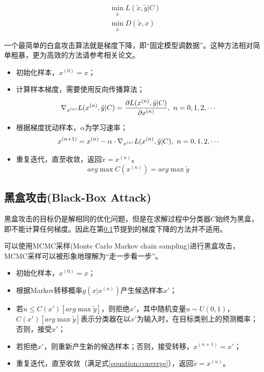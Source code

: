 \documentclass[journal, a4paper]{IEEEtran}
\begin{document}
\begin{align}
    &\min_{\tilde x} L(\tilde x,\tilde y|C) \label{equation:min loss} \\
    &\min_{\tilde x} D(\tilde x, x) \label{equation:min distance}
\end{align}

一个最简单的白盒攻击算法就是梯度下降，即``固定模型调数据''。这种方法相对简单粗暴，更为高效的方法请参考相关论文。

\begin{itemize}
    \item 初始化样本，$x^{(0)}=x$；
    \item 计算样本梯度，需要使用反向传播算法；
\begin{equation}
    \nabla_{x^{(n)}}L(x^{(n)},\tilde y|C)=\frac{\partial L(x^{(n)},\tilde y|C)}{\partial x^{(n)}},\ n=0,1,2,\cdots \notag
\end{equation}
    \item 根据梯度扰动样本，$\alpha$为学习速率；
\begin{equation}
    x^{(n+1)}=x^{(n)}-\alpha\cdot\nabla_{x^{(n)}}L(x^{(n)},\tilde y|C),\ n=0,1,2,\cdots \notag
\end{equation}
    \item 重复迭代，直至收敛，返回$\tilde x=x^{(n)}$。
\begin{equation}
    arg\max C(x^{(n)})=arg\max \tilde y \label{equation:converge}
\end{equation}
\end{itemize}

\subsection{黑盒攻击(Black-Box Attack)}
\label{section:adversarial attack;subsection:black-box}

黑盒攻击的目标仍是解相同的优化问题，但是在求解过程中分类器$C$始终为黑盒，即不能计算任何梯度。因此在第\ref{section:adversarial attack;subsection:black-box}节提到的梯度下降的方法并不适用。

可以使用MCMC采样(Monte Carlo Markov chain sampling)进行黑盒攻击，MCMC采样可以被形象地理解为``走一步看一步''。

\begin{itemize}
    \item 初始化样本，$x^{(0)}=x$；
    \item 根据Markov转移概率$g(x|x^{(n)})$产生候选样本$x'$；
    \item 若$u\le C(x')[arg\max \tilde y]$，则拒绝$x'$，其中随机变量$u\sim U(0,1)$，$C(x')[arg\max \tilde y]$表示分类器在以$x'$为输入时，在目标类别上的预测概率；否则，接受$x'$；
    \item 若拒绝$x'$，则重新产生新的候选样本；否则，接受转移，$x^{(n+1)}=x'$；
    \item 重复迭代，直至收敛（满足式\ref{equation:converge}），返回$\tilde x=x^{(n)}$。
\end{itemize}
\end{document}
